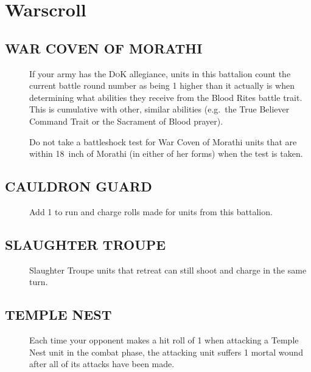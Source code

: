 \newpage
\hypertarget{Warscroll}{%
    \section{Warscroll}\label{warscroll}}
\subsection{WAR COVEN OF MORATHI}
\begin{description}
    \item [] If your army has the
        \textsc{DoK} allegiance, units in this battalion count the
        current battle round number as being 1 higher than it actually is when
        determining what abilities they receive from the Blood Rites battle
        trait. This is cumulative with other, similar abilities
        (e.g.~the True Believer Command Trait or the Sacrament of Blood
        prayer).  \item [] Do not
            take a battleshock test for War Coven of Morathi units that are
            within 18~inch of Morathi (in either of her forms) when the test is
            taken. 
\end{description}
        
\subsection{CAULDRON GUARD}
\begin{description}
    \item [] Add 1 to run and
        charge rolls made for units from this battalion. 
\end{description}
        
\subsection{SLAUGHTER TROUPE}
\begin{description}
    \item []
        Slaughter Troupe units that retreat can still shoot and charge in the
        same turn. 
\end{description}

\subsection{TEMPLE NEST}
\begin{description}
    \item [] Each time your opponent makes a hit roll
  of 1 when attacking a Temple Nest unit in the combat phase, the
  attacking unit suffers 1 mortal wound after all of its attacks have
  been made. 
\end{description}

